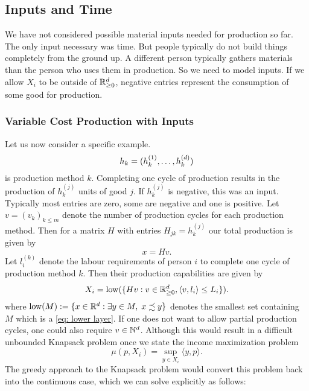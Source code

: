 \subsection{Inputs and Time}
\label{sec: inputs and time}

We have not considered possible material inputs needed for production so far.
The only input necessary was time. But people typically do not build things
completely from the ground up. A different person typically gathers materials
than the person who uses them in production. So we need to model inputs. If we
allow \(X_i\) to be outside of \(\mathbb{R}_{\ge 0}^d\), negative entries
represent the consumption of some good for production.

\subsubsection{Variable Cost Production with Inputs}

Let us now consider a specific example. 
\[
	h_k = (h_k^{(1)},\dots, h_k^{(d)})\]
is production method \(k\). Completing one cycle of production results in the
production of \(h_k^{(j)}\) units of good \(j\). If \(h_k^{(j)}\) is negative, this
was an input. Typically most entries are zero, some are negative and one is
positive. Let \(v = (v_k)_{k\le m}\) denote the number of production cycles for
each production method. Then for a matrix \(H\) with entries
\(H_{jk}=h_k^{(j)}\) our total production is given by
\[
	x = Hv.
\]
Let \(l_i^{(k)}\) denote the labour requirements of person \(i\) to complete
one cycle of production method \(k\). Then their production capabilities are
given by
\[
	X_i = \operatorname{low}(\{ Hv : v\in \mathbb{R}_{\ge 0}^d, \langle v, l_i\rangle \le L_i\}).
\]
where \(\operatorname{low}(M):=\{x\in \mathbb{R}^{d}: \exists y\in M,\; x\precsim y\}\) denotes
the smallest set containing \(M\) which is a \ref{eq: lower layer}. If one does
not want to allow partial production cycles, one could also require
\(v\in\mathbb{N}^d\). Although this would result in a difficult unbounded
Knapsack problem once we state the income maximization problem
\[
	\mu(p, X_i)	= \sup_{y\in X_i} \langle y, p\rangle.
\]
The greedy approach to the Knapsack problem
would convert this problem back into the continuous case, which we can solve
explicitly as follows:

